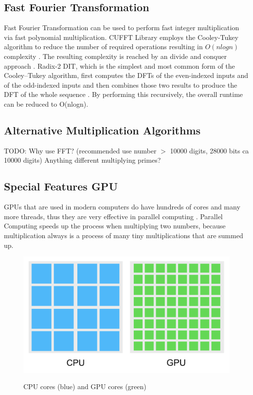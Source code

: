 \documentclass[12pt,a4paper]{article}
\begin{document}
\subsection{Fast Fourier Transformation}
Fast Fourier Transformation can be used to perform fast integer multiplication via fast polynomial multiplication. CUFFT Library employs the Cooley-Tukey algorithm to reduce the number of required operations resulting in $O(nlogn)$ complexity \cite{nvidia2012cuda}. The resulting complexity is reached by an divide and conquer approach \cite{bekele2016cooley}.
Radix-2 DIT, which is the simplest and most common form of the Cooley–Tukey algorithm, first computes the DFTs of the even-indexed inputs and of the odd-indexed inputs and then combines those two results to produce the DFT of the whole sequence \cite{wiki:xxx}. By performing this recursively, the overall runtime can be reduced to O(nlogn).

\subsection{Alternative Multiplication Algorithms}

TODO: Why use FFT? (recommended use number $>$ 10000 digits, 28000 bits ca 10000 digits) Anything different multiplying primes?

\newpage %

\subsection{Special Features GPU}
GPUs that are used in modern computers do have hundreds of cores and many more threads, thus they are very effective in parallel computing \cite{Palacios2011ACO}. Parallel Computing speeds up the process when multiplying two numbers, because multiplication always is a process of many tiny multiplications that are summed up.

\begin{figure}[hbt!]
\centering 
\caption{CPU cores (blue) and GPU cores (green)}
\includegraphics[scale=0.33]{cpugpu.png}
\label{cpugpu_times} 
\end{figure}
\end{document}
